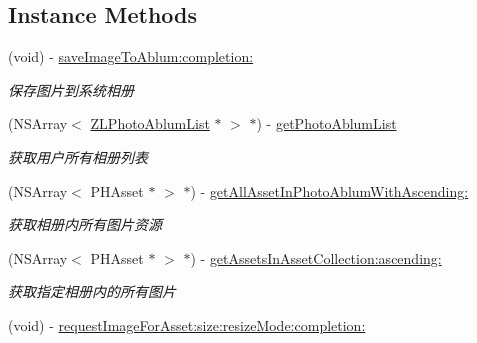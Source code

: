 \subsection*{Instance Methods}
\begin{DoxyCompactItemize}
\item 
\mbox{\label{interface_z_l_photo_tool_aee5e935a66163bf56898ab6e3eaddad9}} 
(void) -\/ \mbox{\hyperlink{interface_z_l_photo_tool_aee5e935a66163bf56898ab6e3eaddad9}{save\+Image\+To\+Ablum\+:completion\+:}}
\begin{DoxyCompactList}\small\item\em 保存图片到系统相册 \end{DoxyCompactList}\item 
\mbox{\label{interface_z_l_photo_tool_a6a82de4dda30c95b0285f5e457dfeb02}} 
(N\+S\+Array$<$ \mbox{\hyperlink{interface_z_l_photo_ablum_list}{Z\+L\+Photo\+Ablum\+List}} $\ast$ $>$ $\ast$) -\/ \mbox{\hyperlink{interface_z_l_photo_tool_a6a82de4dda30c95b0285f5e457dfeb02}{get\+Photo\+Ablum\+List}}
\begin{DoxyCompactList}\small\item\em 获取用户所有相册列表 \end{DoxyCompactList}\item 
(N\+S\+Array$<$ P\+H\+Asset $\ast$ $>$ $\ast$) -\/ \mbox{\hyperlink{interface_z_l_photo_tool_abe37f30dee26fab43e9912e249b244ec}{get\+All\+Asset\+In\+Photo\+Ablum\+With\+Ascending\+:}}
\begin{DoxyCompactList}\small\item\em 获取相册内所有图片资源 \end{DoxyCompactList}\item 
\mbox{\label{interface_z_l_photo_tool_aec7783af92f890e99cb5fe191dc964ea}} 
(N\+S\+Array$<$ P\+H\+Asset $\ast$ $>$ $\ast$) -\/ \mbox{\hyperlink{interface_z_l_photo_tool_aec7783af92f890e99cb5fe191dc964ea}{get\+Assets\+In\+Asset\+Collection\+:ascending\+:}}
\begin{DoxyCompactList}\small\item\em 获取指定相册内的所有图片 \end{DoxyCompactList}\item 
\mbox{\label{interface_z_l_photo_tool_a72863b34a3ad920c3313f13bc0d6f0cf}} 
(void) -\/ \mbox{\hyperlink{interface_z_l_photo_tool_a72863b34a3ad920c3313f13bc0d6f0cf}{request\+Image\+For\+Asset\+:size\+:resize\+Mode\+:completion\+:}}

\end{DoxyCompactItemize}
